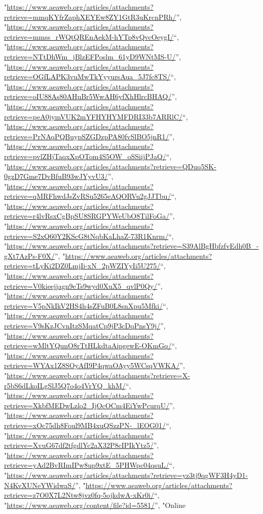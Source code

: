 \documentclass[]{article}
\begin{document}
\begin{itemize}
  "\url{https://www.aeaweb.org/articles/attachments?retrieve=mmqKYfrZaphXEYEw8ZY1GtR3uKrcnPRh/}'',
  "\url{https://www.aeaweb.org/articles/attachments?retrieve=mmss_rWQtQREnAekM-hYTp8vQvcOeygI/}``,
  "\url{https://www.aeaweb.org/articles/attachments?retrieve=NTtDhWm_jBlzEFPoslm_61yD9WNtMS-U/}'',
  "\url{https://www.aeaweb.org/articles/attachments?retrieve=OGfLAPK3vuMwTkYyyursAua_5J7fc8TS/}``,
  "\url{https://www.aeaweb.org/articles/attachments?retrieve=oIU88As80AHuBr5WwAH6yfXhHlrcBHAQ/}'',
  "\url{https://www.aeaweb.org/articles/attachments?retrieve=peA0jymVUK2mYFHYHYMFDRI33b7ARRlC/}``,
  "\url{https://www.aeaweb.org/articles/attachments?retrieve=PrNAqPQBuypSZGDzpPA80fvSlBO5jnR1/}'',
  "\url{https://www.aeaweb.org/articles/attachments?retrieve=pvlZHjTaqxXpOTom4S5OW_oSSiijPJaQ/}``,
  "\url{https://www.aeaweb.org/articles/attachments?retrieve=QDuq5SK-0gzD7Gme7DvBfuB93wJYyvU3/}'',
  "\url{https://www.aeaweb.org/articles/attachments?retrieve=qMRFhwdJsZvRSu5265eAQORVu2gJJTbu/}``,
  "\url{https://www.aeaweb.org/articles/attachments?retrieve=r4lvRsxCgBpSU8SRGPYWeUbO8TilFoGa/}'',
  "\url{https://www.aeaweb.org/articles/attachments?retrieve=S2xQ60Y2KScG8tNqbKaLhaZ-73R1Knrm/}``,
  "\url{https://www.aeaweb.org/articles/attachments?retrieve=S39AlBgHbfzfvEdh0B_-gXt7AzPs-F0X/}'',
  "\url{https://www.aeaweb.org/articles/attachments?retrieve=tLyKi2DZ0LmjIi-xN_2pWZIYyIi5U275/}``,
  "\url{https://www.aeaweb.org/articles/attachments?retrieve=V0kieejjagn9eTs9wyd0XuX5_qvlP0Qy/}'',
  "\url{https://www.aeaweb.org/articles/attachments?retrieve=V5pNkIkV2HS4h4sZFuB0L8snXpu5Mfki/}``,
  "\url{https://www.aeaweb.org/articles/attachments?retrieve=V9sKzJCvnItzSMqatCp9jP3cDqPnsY9j/}'',
  "\url{https://www.aeaweb.org/articles/attachments?retrieve=wMltYQunO8rTtHLkdtaAipgewE-OKmGq/}``,
  "\url{https://www.aeaweb.org/articles/attachments?retrieve=WYAx1Z8SOyAfI9P4qwaOAyy5WCsqVWKA/}'',
  "\url{https://www.aeaweb.org/articles/attachments?retrieve=X-r5bS6dLkoILgSlJ5Q7o4o4VrYQ_khM/}``,
  "\url{https://www.aeaweb.org/articles/attachments?retrieve=XkbfMEDwLzlo2_IjOcOCm4EiYwPcurqU/}'',
  "\url{https://www.aeaweb.org/articles/attachments?retrieve=xOc75dh8Foul9MB4xuQSzzPN-_lEOG01/}``,
  "\url{https://www.aeaweb.org/articles/attachments?retrieve=XvuG67df2tfgdlYc2aX32P8cIPIkYtz5/}'',
  "\url{https://www.aeaweb.org/articles/attachments?retrieve=yAd2BvRImIPw8up9xtE_5PHWpc04qsuL/}``,
  "\url{https://www.aeaweb.org/articles/attachments?retrieve=yz3tj9qgWF3H4yD1-N4KvXUNeYWidwaS/}'',
  "\url{https://www.aeaweb.org/articles/attachments?retrieve=z7O0X7L2Ntw8jvz0fq-5ojkdwA-xKr0i/}``,
  "\url{https://www.aeaweb.org/content/file?id=5581/}'', "Online

\end{itemize}
\end{document}
